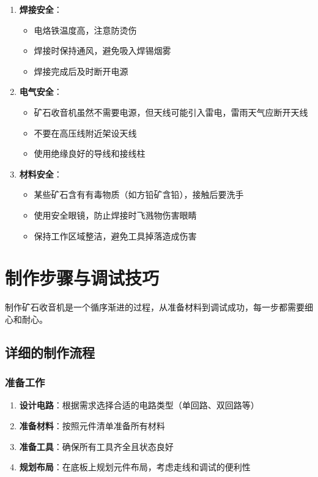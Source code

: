 \documentclass[12pt,UTF8]{ctexbook}
\begin{document}
\begin{enumerate}[leftmargin=3.5em]
    \item \textbf{焊接安全}：
        \begin{itemize}[leftmargin=3.5em]
            \item 电烙铁温度高，注意防烫伤
            \item 焊接时保持通风，避免吸入焊锡烟雾
            \item 焊接完成后及时断开电源
        \end{itemize}
    \item \textbf{电气安全}：
        \begin{itemize}[leftmargin=3.5em]
            \item 矿石收音机虽然不需要电源，但天线可能引入雷电，雷雨天气应断开天线
            \item 不要在高压线附近架设天线
            \item 使用绝缘良好的导线和接线柱
        \end{itemize}
    \item \textbf{材料安全}：
        \begin{itemize}[leftmargin=3.5em]
            \item 某些矿石含有有毒物质（如方铅矿含铅），接触后要洗手
            \item 使用安全眼镜，防止焊接时飞溅物伤害眼睛
            \item 保持工作区域整洁，避免工具掉落造成伤害
        \end{itemize}
\end{enumerate}

\section{制作步骤与调试技巧}

制作矿石收音机是一个循序渐进的过程，从准备材料到调试成功，每一步都需要细心和耐心。

\subsection{详细的制作流程}

\subsubsection{准备工作}

\begin{enumerate}[leftmargin=3.5em]
    \item \textbf{设计电路}：根据需求选择合适的电路类型（单回路、双回路等）
    \item \textbf{准备材料}：按照元件清单准备所有材料
    \item \textbf{准备工具}：确保所有工具齐全且状态良好
    \item \textbf{规划布局}：在底板上规划元件布局，考虑走线和调试的便利性
\end{enumerate}
\end{document}
